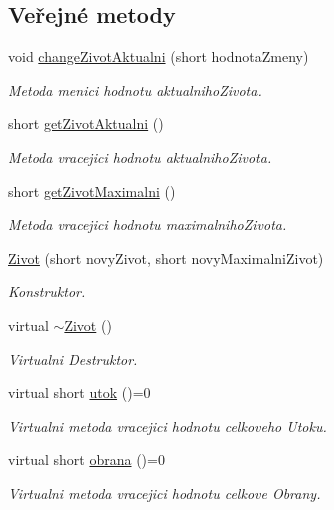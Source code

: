 \subsection*{Veřejné metody}
\begin{DoxyCompactItemize}
\item 
void \hyperlink{classIceAge_1_1Zivot_a980dc5a5af6d14c23ecca025e3ec7485}{change\+Zivot\+Aktualni} (short hodnota\+Zmeny)
\begin{DoxyCompactList}\small\item\em Metoda menici hodnotu aktualniho\+Zivota. \end{DoxyCompactList}\item 
short \hyperlink{classIceAge_1_1Zivot_ae4e3a167722a80ccace3985f183ddd8d}{get\+Zivot\+Aktualni} ()
\begin{DoxyCompactList}\small\item\em Metoda vracejici hodnotu aktualniho\+Zivota. \end{DoxyCompactList}\item 
short \hyperlink{classIceAge_1_1Zivot_a75a65879dd6ddc0bc3e402ac6f613813}{get\+Zivot\+Maximalni} ()
\begin{DoxyCompactList}\small\item\em Metoda vracejici hodnotu maximalniho\+Zivota. \end{DoxyCompactList}\item 
\hyperlink{classIceAge_1_1Zivot_a97d6d435c5f046fdf0cf295fad6db7c6}{Zivot} (short novy\+Zivot, short novy\+Maximalni\+Zivot)
\begin{DoxyCompactList}\small\item\em Konstruktor. \end{DoxyCompactList}\item 
virtual \hyperlink{classIceAge_1_1Zivot_a998f76a4813dfecc610acbabdb037bae}{$\sim$\+Zivot} ()
\begin{DoxyCompactList}\small\item\em Virtualni Destruktor. \end{DoxyCompactList}\item 
virtual short \hyperlink{classIceAge_1_1Zivot_a8cb36d6191c9e77a97d90833b6f0824d}{utok} ()=0
\begin{DoxyCompactList}\small\item\em Virtualni metoda vracejici hodnotu celkoveho Utoku. \end{DoxyCompactList}\item 
virtual short \hyperlink{classIceAge_1_1Zivot_a7d712f401ea189ed382f5cf05869a37a}{obrana} ()=0
\begin{DoxyCompactList}\small\item\em Virtualni metoda vracejici hodnotu celkove Obrany. \end{DoxyCompactList}\end{DoxyCompactItemize}
